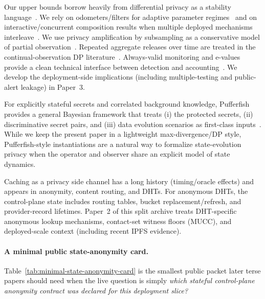 \documentclass[11pt]{article}
\begin{document}
Our upper bounds borrow heavily from differential privacy as a stability language~\cite{dworkroth2014foundations}.
We rely on odometers/filters for adaptive parameter regimes~\cite{rogers2016odometers} and on interactive/concurrent composition results when multiple deployed mechanisms interleave~\cite{vadhanwang2021concurrentdp,zhang2023concurrentinteractive}.
We use privacy amplification by subsampling as a conservative model of partial observation~\cite{balle2018subsampling}.
Repeated aggregate releases over time are treated in the continual-observation DP literature~\cite{dwork2010continual,chan2010continual}.
Always-valid monitoring and e-values provide a clean technical interface between detection and accounting~\cite{howard2021confseq,ramdas2024evalues}. We develop the deployment-side implications (including multiple-testing and public-alert leakage) in Paper~3.

For explicitly stateful secrets and correlated background knowledge, Pufferfish provides a general Bayesian framework that treats (i) the protected secrets, (ii) discriminative secret pairs, and (iii) data evolution scenarios as first-class inputs~\cite{kifer2014pufferfish}.
While we keep the present paper in a lightweight max-divergence/DP style, Pufferfish-style instantiations are a natural way to formalize state-evolution privacy when the operator and observer share an explicit model of state dynamics.

Caching as a privacy side channel has a long history (timing/oracle effects) and appears in anonymity, content routing, and DHTs.
For anonymous DHTs, the control-plane state includes routing tables, bucket replacement/refresh, and provider-record lifetimes.
Paper~2 of this split archive treats DHT-specific anonymous lookup mechanisms, contact-set witness floors (MUCC), and deployed-scale context (including recent IPFS evidence).




\paragraph{A minimal public state-anonymity card.}
Table~\ref{tab:minimal-state-anonymity-card} is the smallest public packet later terse papers should need when the live question is simply \emph{which stateful control-plane anonymity contract was declared for this deployment slice?}
\end{document}
